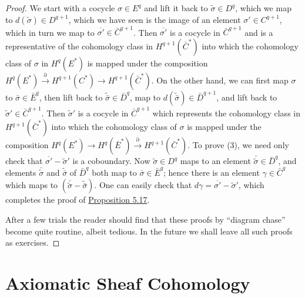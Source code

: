 \begin{proof}
We start with a cocycle $\sigma\in E^{q}$ and lift it back to $\tilde{\sigma}\in D^{q}$, which we map to $d(\tilde{\sigma})\in D^{q+1}$, which we have seen is the image of an element $\sigma'\in C^{q+1}$, which in turn we map to $\overline{\sigma'}\in\bar{C}^{q+1}$. Then $\overline{\sigma'}$ is a cocycle in $\bar{C}^{q+1}$ and is a representative of the cohomology class in $H^{q+1}(\bar{C}^{*})$ into which the cohomology class of $\sigma$ in $H^{q}(E^{*})$ is mapped under the composition $H^{q}(E^{*})\xrightarrow{\partial}H^{q+1}(C^{*})\to H^{q+1}(\bar{C}^{*})$. On the other hand, we can first map $\sigma$ to $\bar{\sigma}\in\bar{E}^{q}$, then lift back to $\tilde{\bar{\sigma}}\in\bar{D}^{q}$, map to $d(\tilde{\bar{\sigma}})\in\bar{D}^{q+1}$, and lift back to $\tilde{\sigma}'\in\bar{C}^{q+1}$. Then $\tilde{\sigma}'$ is a cocycle in $\bar{C}^{q+1}$ which represents the cohomology class in $H^{q+1}(\bar{C}^{*})$ into which the cohomology class of $\sigma$ is mapped under the composition $H^{q}(E^{*})\to H^{q}(\bar{E}^{*})\xrightarrow{\partial}H^{q+1}(\bar{C}^{*})$. To prove (3), we need only check that $\overline{\sigma'}-\tilde{\sigma}'$ is a coboundary. Now $\tilde{\sigma}\in D^{q}$ maps to an element $\bar{\tilde{\sigma}}\in\bar{D}^{q}$, and elements $\bar{\tilde{\sigma}}$ and $\tilde{\bar{\sigma}}$ of $\bar{D}^{q}$ both map to $\bar{\sigma}\in\bar{E}^{q}$; hence there is an element $\gamma\in\bar{C}^{q}$ which maps to $(\bar{\tilde{\sigma}}-\tilde{\bar{\sigma}})$. One can easily check that $d\gamma=\overline{\sigma'}-\tilde{\sigma}'$, which completes the proof of \hyperref[thm:5.17]{Proposition 5.17}.

After a few trials the reader should find that these proofs by “diagram chase” become quite routine, albeit tedious. In the future we shall leave all such proofs as exercises.

\end{proof}

\section{Axiomatic Sheaf Cohomology}


